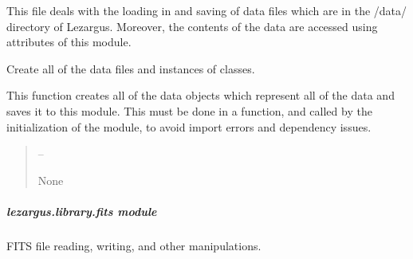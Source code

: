 \documentclass[letterpaper,11pt,english]{sphinxmanual}
\begin{document}
\sphinxAtStartPar
This file deals with the loading in and saving of data files which are in
the /data/ directory of Lezargus. Moreover, the contents of the data
are accessed using attributes of this module.

\begin{savenotes}\begin{fulllineitems}
\label{\detokenize{code/lezargus.library.data:lezargus.library.data.initialize_data_files}}
\pysigstartsignatures
{}
\pysigstopsignatures
\sphinxAtStartPar
Create all of the data files and instances of classes.

\sphinxAtStartPar
This function creates all of the data objects which represent all of the
data and saves it to this module. This must be done in a function, and
called by the initialization of the module, to avoid import errors and
dependency issues.
\begin{quote}\begin{description}
\sphinxAtStartPar
{} – 

\sphinxAtStartPar
None

\end{description}\end{quote}

\end{fulllineitems}\end{savenotes}


\sphinxstepscope


\subparagraph{lezargus.library.fits module}
\label{\detokenize{code/lezargus.library.fits:module-lezargus.library.fits}}\label{\detokenize{code/lezargus.library.fits:lezargus-library-fits-module}}\label{\detokenize{code/lezargus.library.fits::doc}}
\sphinxAtStartPar
FITS file reading, writing, and other manipulations.
\end{document}
